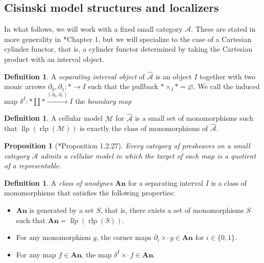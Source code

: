 \documentclass[a4paper]{article}
\numberwithin{equation}{subsection}
\theoremstyle{plain}   %
\newtheorem{prop}[equation]{Proposition}
\theoremstyle{definition}
\newtheorem{defn}[equation]{Definition}
\theoremstyle{remark}
\theoremstyle{plain}
\newcommand{\psh}[1]{\ensuremath{\widehat{#1}}}
\begin{document}
\subsection{Cisinski model structures and localizers}
In what follows, we will work with a fixed small category \(\mathcal{A}\). These are stated in more generality in \cite{cisinski-book}*{Chapter 1}, but we will specialize to the case of a Cartesian cylinder functor, that is, a cylinder functor determined by taking the Cartesian product with an interval object.
\begin{defn}
	A \emph{separating interval object} of \(\psh{\mathcal{A}}\) is an object \(I\) together with two monic arrows \(\partial_0,\partial_1:\ast \to I\) such that the pullback \(\ast \times_{I} \ast=\varnothing\).  We call the induced map \(\delta^I:\ast \coprod \ast \xrightarrow{(\partial_0,\partial_1)} I\) the \emph{boundary map}
\end{defn}
\begin{defn}
	A cellular model \(\mathscr{M}\) for \(\psh{\mathcal{A}}\) is a small set of monomorphisms such that \(\operatorname{llp}(\operatorname{rlp}(\mathscr{M}))\) is exactly the class of monomorphisms of \(\psh{\mathcal{A}}\).   
\end{defn}
\begin{prop}[\cite{cisinski-book}*{Proposition 1.2.27}]
	Every category of presheaves on a small category \(\mathcal{A}\) admits a cellular model in which the target of each map is a quotient of a representable.
\end{prop}
\begin{defn}
	A \emph{class of anodynes} \(\mathbf{An}\) for a separating interval \(I\) is a class of monomorphisms that satisfies the following properties:
	\begin{itemize}
		\item \(\mathbf{An}\) is generated by a set \(S\), that is, there exists a set of monomorphisms \(S\) such that \(\mathbf{An}=\operatorname{llp}(\operatorname{rlp}(S))\).
		\item For any monomorphism \(g\), the corner maps \(\partial_i \times^\lrcorner g\in \mathbf{An}\) for \(i\in \{0,1\}\).  
		\item For any map \(f\in \mathbf{An}\), the map \(\delta^I \times^\lrcorner f \in \mathbf{An}\).  
	\end{itemize} 
\end{defn}
\end{document}
